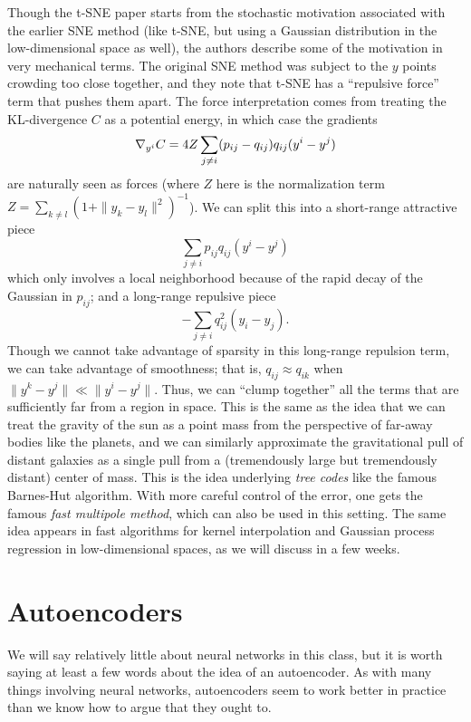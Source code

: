 \documentclass[12pt, leqno]{article} %
\begin{document}
Though the t-SNE paper starts from the stochastic motivation
associated with the earlier SNE method (like t-SNE, but using a
Gaussian distribution in the low-dimensional space as well), the
authors describe some of the motivation in very mechanical terms.  The
original SNE method was subject to the $y$ points crowding too close
together, and they note that t-SNE has a ``repulsive force'' term that
pushes them apart.  The force interpretation comes from treating the
KL-divergence $C$ as a potential energy, in which case the gradients
\[
  \nabla_{y^i} C = 4 Z \sum_{j \neq i} (p_{ij}-q_{ij}) q_{ij} (y^i-y^j) \\
\]
are naturally seen as forces (where $Z$ here is the normalization term
$Z = \sum_{k \neq l} (1+\|y_k-y_l\|^2)^{-1}$).  We can split this into
a short-range attractive piece
\[
  \sum_{j\neq i} p_{ij} q_{ij} (y^i-y^j)
\]
which only involves a local neighborhood because of the rapid decay of
the Gaussian in $p_{ij}$; and a long-range repulsive piece
\[
  -\sum_{j \neq i} q_{ij}^2 (y_i-y_j).
\]
Though we cannot take advantage of sparsity in this long-range
repulsion term, we can take advantage of smoothness; that is,
$q_{ij} \approx q_{ik}$ when $\|y^k-y^j\| \ll \|y^i-y^j\|$.  Thus, we
can ``clump together'' all the terms that are sufficiently far from a
region in space.  This is the same as the idea that we can treat the
gravity of the sun as a point mass from the perspective of far-away
bodies like the planets, and we can similarly approximate the
gravitational pull of distant galaxies as a single pull from a
(tremendously large but tremendously distant) center of mass.  This is
the idea underlying {\em tree codes} like the famous Barnes-Hut
algorithm.  With more careful control of the error, one gets the
famous {\em fast multipole method}, which can also be used in this
setting.  The same idea appears in fast algorithms for kernel
interpolation and Gaussian process regression in low-dimensional
spaces, as we will discuss in a few weeks.

\section{Autoencoders}


We will say relatively little about neural networks in this class,
but it is worth saying at least a few words about the idea of an
autoencoder.  As with many things involving neural networks,
autoencoders seem to work better in practice than we know how
to argue that they ought to.
\end{document}
